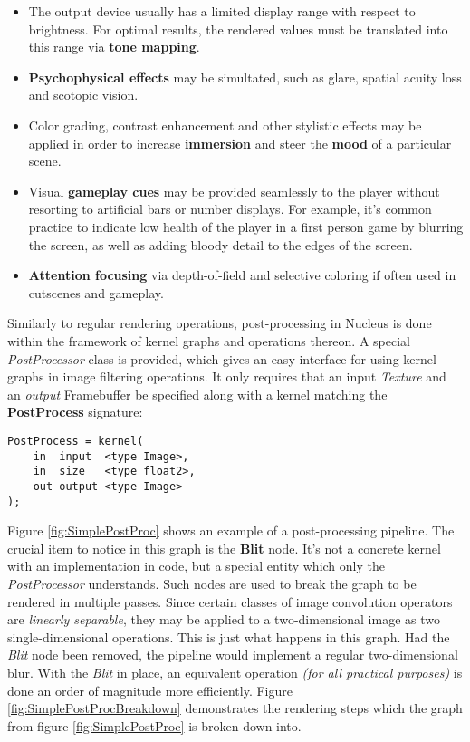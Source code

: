 \begin{itemize}
\item The output device usually has a limited display range with respect to brightness. For optimal results, the rendered values must be translated into this range via \textbf{tone mapping}.
\item \textbf{Psychophysical effects} may be simultated, such as glare, spatial acuity loss and scotopic vision.
\item Color grading, contrast enhancement and other stylistic effects may be applied in order to increase \textbf{immersion} and steer the \textbf{mood} of a particular scene.
\item Visual \textbf{gameplay cues} may be provided seamlessly to the player without resorting to artificial bars or number displays. For example, it's common practice to indicate low health of the player in a first person game by blurring the screen, as well as adding bloody detail to the edges of the screen.
\item \textbf{Attention focusing} via depth-of-field and selective coloring if often used in cutscenes and gameplay.
\end{itemize}

Similarly to regular rendering operations, post-processing in Nucleus is done within the framework of kernel graphs and operations thereon. A special \emph{PostProcessor} class is provided, which gives an easy interface for using kernel graphs in image filtering operations. It only requires that an input \emph{Texture} and an \emph{output} Framebuffer be specified along with a kernel matching the \textbf{PostProcess} signature:

\begin{lstlisting}[frame=single]
PostProcess = kernel(
    in  input  <type Image>,
    in  size   <type float2>,
    out output <type Image>
);
\end{lstlisting}

Figure \ref{fig:SimplePostProc} shows an example of a post-processing pipeline. The crucial item to notice in this graph is the \textbf{Blit} node. It's not a concrete kernel with an implementation in code, but a special entity which only the \emph{PostProcessor} understands. Such nodes are used to break the graph to be rendered in multiple passes. Since certain classes of image convolution operators are \emph{linearly separable}, they may be applied to a two-dimensional image as two single-dimensional operations. This is just what happens in this graph. Had the \emph{Blit} node been removed, the pipeline would implement a regular two-dimensional blur. With the \emph{Blit} in place, an equivalent operation \emph{(for all practical purposes)} is done an order of magnitude more efficiently. Figure \ref{fig:SimplePostProcBreakdown} demonstrates the rendering steps which the graph from figure \ref{fig:SimplePostProc} is broken down into.

